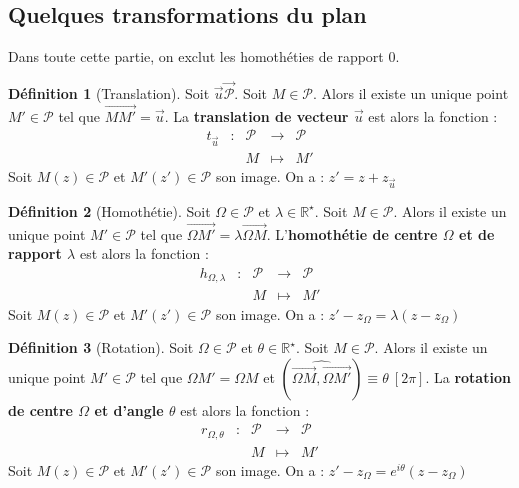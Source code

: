 \documentclass[french]{book}
\newcommand{\R}{\mathbb{R}}
\newcommand{\st}{^\star}
\theoremstyle{plain}
\theoremstyle{definition}
\newtheorem{dfn}{Définition}[chapter]
\theoremstyle{remark}
\begin{document}
\subsection{Quelques transformations du plan}
Dans toute cette partie, on exclut les homothéties de rapport $0$.
\begin{dfn}[Translation]
	Soit $\overrightarrow{u}\overrightarrow{\mathcal{P}}$. Soit $M\in\mathcal{P}$. Alors il existe un unique point $M'\in\mathcal{P}$ tel que $\overrightarrow{MM'}=\overrightarrow{u}$. La \textbf{translation de vecteur $\overrightarrow{u}$} est alors la fonction : $$\begin{array}{ccccc}t_{\overrightarrow{u}}&:&\mathcal{P}&\rightarrow&\mathcal{P}\\&&M&\mapsto&M'\end{array}$$ Soit $M(z)\in\mathcal{P}$ et $M'(z')\in\mathcal{P}$ son image. On a : $z'=z+z_{\overrightarrow{u}}$
\end{dfn}
\begin{dfn}[Homothétie]
	Soit $\Omega\in\mathcal{P}$ et $\lambda\in\R\st$. Soit $M\in\mathcal{P}$. Alors il existe un unique point $M'\in\mathcal{P}$ tel que $\overrightarrow{\Omega M'}=\lambda\overrightarrow{\Omega M}$. L'\textbf{homothétie de centre $\Omega$ et de rapport $\lambda$} est alors la fonction : $$\begin{array}{ccccc}h_{\Omega,\lambda}&:&\mathcal{P}&\rightarrow&\mathcal{P}\\&&M&\mapsto&M'\end{array}$$ Soit $M(z)\in\mathcal{P}$ et $M'(z')\in\mathcal{P}$ son image. On a : $z'-z_{\Omega}=\lambda(z-z_{\Omega})$
\end{dfn}
\begin{dfn}[Rotation]
	Soit $\Omega\in\mathcal{P}$ et $\theta\in\R\st$. Soit $M\in\mathcal{P}$. Alors il existe un unique point $M'\in\mathcal{P}$ tel que $\Omega M'=\Omega M$ et $(\widehat{\overrightarrow{\Omega M},\overrightarrow{\Omega M'}})\equiv\theta\ [2\pi]$. La \textbf{rotation de centre $\Omega$ et d'angle $\theta$} est alors la fonction : $$\begin{array}{ccccc}r_{\Omega,\theta}&:&\mathcal{P}&\rightarrow&\mathcal{P}\\&&M&\mapsto&M'\end{array}$$ Soit $M(z)\in\mathcal{P}$ et $M'(z')\in\mathcal{P}$ son image. On a : $z'-z_{\Omega}=e^{i\theta}(z-z_{\Omega})$
\end{dfn}
\end{document}
